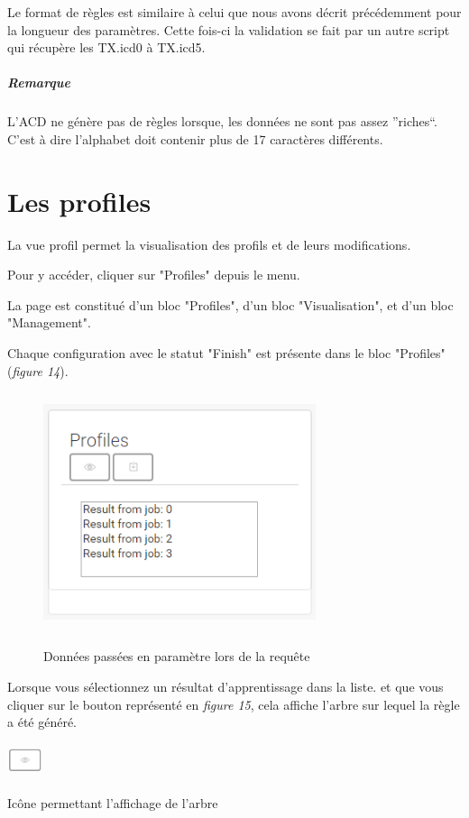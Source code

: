 \documentclass[a4paper,10pt,justified,openany]{tufte-book}
\begin{document}
Le format de règles est similaire à celui que nous avons décrit précédemment pour la longueur des paramètres. 
Cette fois-ci la validation se fait par un autre script qui récupère les TX.icd0 à TX.icd5. 

\paragraph{\textbf{Remarque}}
L'ACD ne génère pas de règles lorsque, les données ne sont pas assez ''riches``. C'est à dire l'alphabet doit contenir plus de 17 caractères différents. 

\chapter{Les profiles}

La vue profil permet la visualisation des profils et de leurs modifications.
 
Pour y accéder, cliquer sur "Profiles" depuis le menu.
 
La page est constitué d'un bloc "Profiles", d'un bloc "Visualisation", et d'un bloc "Management".
 
Chaque configuration avec le statut "Finish" est présente dans le bloc "Profiles" ({\itshape figure 14}). 

\begin{figure}
\includegraphics[width=8cm, height=7cm]{./images/profilevisu.png}
\label{iconevueapprentissage}
\caption{Données passées en paramètre lors de la requête}
\end{figure}

Lorsque vous sélectionnez un résultat d'apprentissage dans la liste. et que vous cliquer sur le bouton représenté en {\itshape figure 15}, cela affiche l'arbre sur lequel la règle a été généré. 

\begin{marginfigure}
\includegraphics[width=1cm, height=1cm]{./images/visuresultjobs.png}
\label{iconevueapprentissage}
\caption{Icône permettant l'affichage de l'arbre}
\end{marginfigure}
\end{document}
